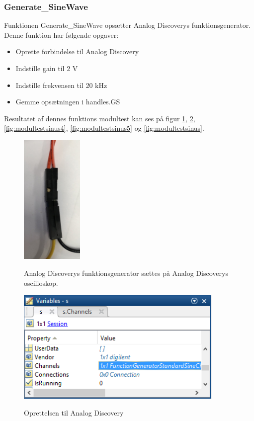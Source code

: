 \subsubsection{Generate\_SineWave} 

Funktionen Generate\_SineWave opsætter Analog Discoverys funktionsgenerator. Denne funktion har følgende opgaver:
\begin{itemize}
\item Oprette forbindelse til Analog Discovery
\item Indstille gain til 2 V
\item Indstille frekvensen til 20 kHz
\item Gemme opsætningen i handles.GS
\end{itemize}

Resultatet af dennes funktions modultest kan ses på figur \ref{fig:modultestsinus1}, \ref{fig:modultestsinus3}, \ref{fig:modultestsinus4}, \ref{fig:modultestsinus5} og \ref{fig:modultestsinus}.

\begin{figure}[H] 
\centering
{\includegraphics[width=3cm]
{Figure/modultestsinus2}}
\caption{Analog Discoverys funktionsgenerator sættes på Analog Discoverys oscilloskop.}
\label{fig:modultestsinus1}
\end{figure}


\begin{figure}[H] 
\centering
{\includegraphics[width=10cm]
{Figure/modultestsinus3}}
\caption{Oprettelsen til Analog Discovery}
\label{fig:modultestsinus3}
\end{figure}



